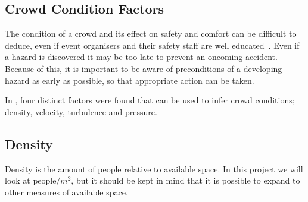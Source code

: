




\subsection{Crowd Condition Factors}

The condition of a crowd and its effect on safety and comfort can be difficult to deduce, even if event organisers and their safety staff are well educated~\cite{franke2015smart}. Even if a hazard is discovered it may be too late to prevent an oncoming accident. Because of this, it is important to be aware of preconditions of a developing hazard as early as possible, so that appropriate action can be taken.

In \citet{wirz2012inferring}, four distinct factors were found that can be used to infer crowd conditions; density, velocity, turbulence and pressure.

\subsection{Density}
Density is the amount of people relative to available space. In this project we will look at $\text{people} / m^2$, but it should be kept in mind that it is possible to expand to other measures of available space.

